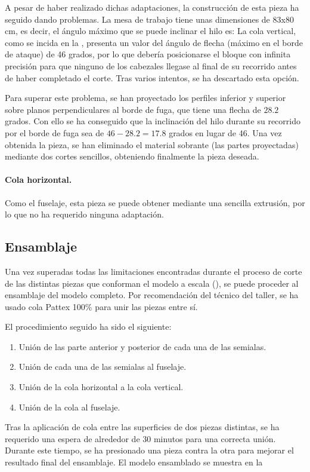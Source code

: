 A pesar de haber realizado dichas adaptaciones, la construcción de esta pieza ha seguido dando problemas. La mesa de trabajo tiene unas dimensiones de 83x80 cm, es decir, el ángulo máximo que se puede inclinar el hilo es:
La cola vertical, como se incida en la , presenta un valor del ángulo de flecha (máximo en el borde de ataque) de 46 grados, por lo que debería posicionarse el bloque con infinita precisión para que ninguno de los cabezales llegase al final de su recorrido antes de haber completado el corte. Tras varios intentos, se ha descartado esta opción.

Para superar este problema, se han proyectado los perfiles inferior y superior sobre planos perpendiculares al borde de fuga, que tiene una flecha de $28.2$ grados. Con ello se ha conseguido que la inclinación del hilo durante su recorrido por el borde de fuga sea de $46 - 28.2 = 17.8$ grados en lugar de 46. Una vez obtenida la pieza, se han eliminado el material sobrante (las partes proyectadas) mediante dos cortes sencillos, obteniendo finalmente la pieza deseada.

\paragraph{Cola horizontal.} Como el fuselaje, esta pieza se puede obtener mediante una sencilla extrusión, por lo que no ha requerido ninguna adaptación.


\subsection{Ensamblaje}
\label{sec:building:assembly}

Una vez superadas todas las limitaciones encontradas durante el proceso de corte de las distintas piezas que conforman el modelo a escala (), se puede proceder al ensamblaje del modelo completo. Por recomendación del técnico del taller, se ha usado cola Pattex 100\% para unir las piezas entre sí.

El procedimiento seguido ha sido el siguiente:
\begin{enumerate}
\item Unión de las parte anterior y posterior de cada una de las semialas.
\item Unión de cada una de las semialas al fuselaje.
\item Unión de la cola horizontal a la cola vertical.
\item Unión de la cola al fuselaje.
\end{enumerate}

Tras la aplicación de cola entre las superficies de dos piezas distintas, se ha requerido una espera de alrededor de 30 minutos para una correcta unión. Durante este tiempo, se ha presionado una pieza contra la otra para mejorar el resultado final del ensamblaje. El modelo ensamblado se muestra en la 
\FloatBarrier
